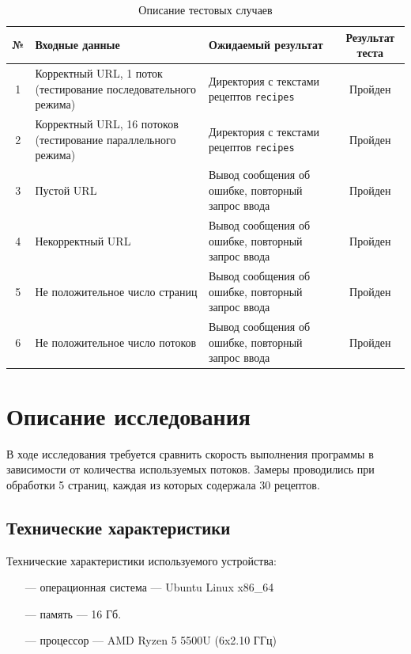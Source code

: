 \begin{table}[h!]
    \begin{center}
		\begin{threeparttable}
    \caption{Описание тестовых случаев}
    \captionsetup{justification=raggedright, singlelinecheck=false}
    \label{tbl:tests}
    \begin{tabular}{|c|p{6cm}|p{6cm}|c|}
        \hline
        \textbf{№} & \textbf{Входные данные} & \textbf{Ожидаемый результат} & \textbf{Результат теста} \\
        \hline
        1 & Корректный URL, 1 поток (тестирование последовательного режима) & Директория с текстами рецептов \texttt{recipes} & Пройден \\
        \hline
        2 & Корректный URL, 16 потоков (тестирование параллельного режима) & Директория с текстами рецептов \texttt{recipes} & Пройден \\
        \hline
        3 & Пустой URL & Вывод сообщения об ошибке, повторный запрос ввода & Пройден \\
        \hline
        4 & Некорректный URL & Вывод сообщения об ошибке, повторный запрос ввода & Пройден \\
        \hline
        5 & Не положительное число страниц & Вывод сообщения об ошибке, повторный запрос ввода & Пройден \\
        \hline
        6 & Не положительное число потоков & Вывод сообщения об ошибке, повторный запрос ввода & Пройден \\
        \hline
    \end{tabular}
    \end{threeparttable}
    \end{center}
\end{table}




\chapter{Описание исследования}
В ходе исследования требуется сравнить скорость выполнения программы в зависимости от количества используемых потоков. Замеры проводились при обработки 5 страниц, каждая из которых содержала 30 рецептов.

\section{Технические характеристики}
Технические характеристики используемого устройства:
\begin{itemize}
    \item[---] операционная система --- Ubuntu Linux x86\_64 \cite{Ubuntu}
    \item[---] память --- 16 Гб.
    \item[---] процессор --- AMD Ryzen 5 5500U (6x2.10 ГГц) \cite{AMD}
\end{itemize}

